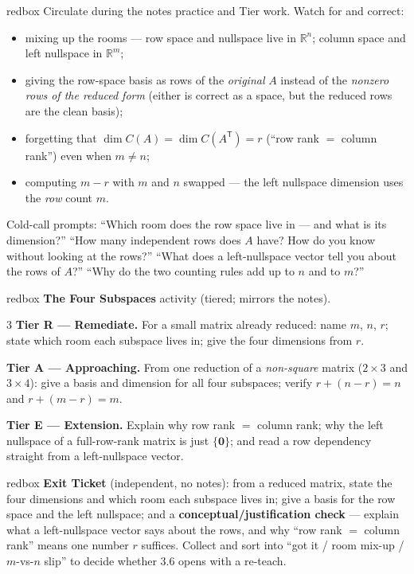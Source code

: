 \documentclass[10pt]{article}
\newcommand{\zero}{\mathbf{0}}
\newcommand{\T}{\mathsf{T}}
\begin{document}
\begin{skillbox}{redbox}
Circulate during the notes practice and Tier work. Watch for and correct:
\begin{itemize}[leftmargin=1.2em, nosep]
  \item mixing up the rooms --- row space and nullspace live in $\mathbb{R}^n$; column space and left nullspace in $\mathbb{R}^m$;
  \item giving the row-space basis as rows of the \emph{original} $A$ instead of the \emph{nonzero rows of the reduced form} (either is correct as a space, but the reduced rows are the clean basis);
  \item forgetting that $\dim C(A)=\dim C(A^{\T})=r$ (``row rank $=$ column rank'') even when $m\ne n$;
  \item computing $m-r$ with $m$ and $n$ swapped --- the left nullspace dimension uses the \emph{row} count $m$.
\end{itemize}
Cold-call prompts: ``Which room does the row space live in --- and what is its dimension?'' ``How many
independent rows does $A$ have? How do you know without looking at the rows?'' ``What does a left-nullspace
vector tell you about the rows of $A$?'' ``Why do the two counting rules add up to $n$ and to $m$?''
\end{skillbox}

\begin{skillbox}{redbox}
\textbf{The Four Subspaces} activity (tiered; mirrors the notes).
\begin{multicols}{3}
\textbf{Tier R --- Remediate.} For a small matrix already reduced: name $m$, $n$, $r$; state which room each
subspace lives in; give the four dimensions from $r$.

\columnbreak
\textbf{Tier A --- Approaching.} From one reduction of a \emph{non-square} matrix ($2\times3$ and $3\times4$):
give a basis and dimension for all four subspaces; verify $r+(n-r)=n$ and $r+(m-r)=m$.

\columnbreak
\textbf{Tier E --- Extension.} Explain why row rank $=$ column rank; why the left nullspace of a
full-row-rank matrix is just $\{\zero\}$; and read a row dependency straight from a left-nullspace vector.
\end{multicols}
\end{skillbox}

\begin{skillbox}{redbox}
\textbf{Exit Ticket} (independent, no notes): from a reduced matrix, state the four dimensions and which
room each subspace lives in; give a basis for the row space and the left nullspace; and a
\textbf{conceptual/justification check} --- explain what a left-nullspace vector says about the rows, and why
``row rank $=$ column rank'' means one number $r$ suffices. Collect and sort into ``got it / room mix-up /
$m$-vs-$n$ slip'' to decide whether 3.6 opens with a re-teach.
\end{skillbox}
\end{document}
